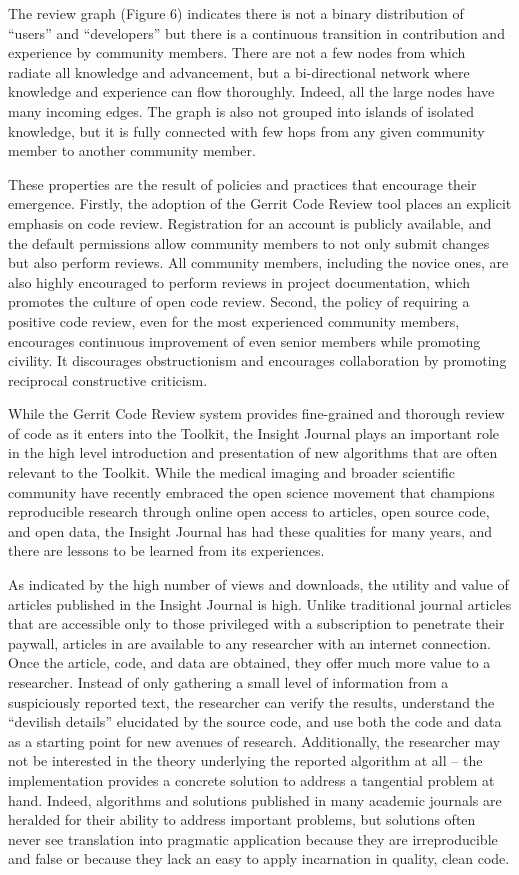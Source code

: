 \documentclass{frontiersENG} %
\begin{document}
The review graph (Figure 6) indicates there is not a binary distribution of
``users'' and ``developers'' but there is a continuous transition in
contribution and experience by community members. There are not a few nodes
from which radiate all knowledge and advancement, but a bi-directional network
where knowledge and experience can flow thoroughly.  Indeed, all the large
nodes have many incoming edges. The graph is also not grouped into islands of
isolated knowledge, but it is fully connected with few hops from any given
community member to another community member.

These properties are the result of policies and practices that encourage their
emergence. Firstly, the adoption of the Gerrit Code Review tool places an
explicit emphasis on code review.  Registration for an account is publicly
available, and the default permissions allow community members to not only
submit changes but also perform reviews. All community members, including the
novice ones, are also highly encouraged to perform reviews in project
documentation, which promotes the culture of open code review. Second, the
policy of requiring a positive code review, even for the most experienced
community members, encourages continuous improvement of even senior members
while promoting civility. It discourages obstructionism and encourages
collaboration by promoting reciprocal constructive criticism.

While the Gerrit Code Review system provides fine-grained and thorough review
of code as it enters into the Toolkit, the Insight Journal plays an important
role in the high level introduction and presentation of new algorithms that
are often relevant to the Toolkit. While the medical imaging and broader
scientific community have recently embraced the open science movement that
champions reproducible research through online open access to articles, open
source code, and open data, the Insight Journal has had these qualities for
many years, and there are lessons to be learned from its experiences.

As indicated by the high number of views and downloads, the utility and value of
articles published in the Insight Journal is high.  Unlike traditional
journal articles that are accessible only to those privileged with a
subscription to penetrate their paywall, articles in are available to any
researcher with an internet connection. Once the article, code, and data are
obtained, they offer much more value to a researcher. Instead of only gathering
a small level of information from a suspiciously reported text, the researcher
can verify the results, understand the ``devilish details'' elucidated by the
source code, and use both the code and data as a starting point for new avenues
of research. Additionally, the researcher may not be interested in the theory
underlying the reported algorithm at all -- the implementation provides a
concrete solution to address a tangential problem at hand. Indeed, algorithms
and solutions published in many academic journals are heralded for their
ability to address important problems, but solutions often never see
translation into pragmatic application because they are irreproducible and
false or because they lack an easy to apply incarnation in quality, clean code.
\end{document}
